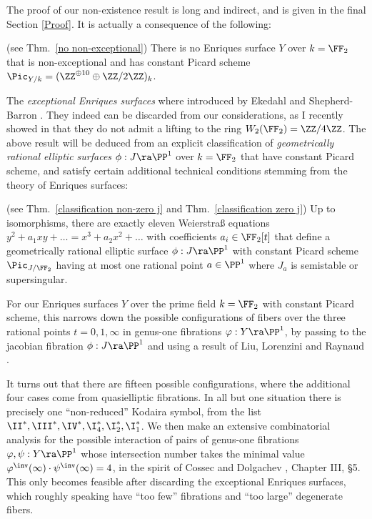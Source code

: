 The proof of our non-existence result is long and indirect, and is given in the final Section \ref{Proof}.
It is actually a  consequence of the following:

\begin{maintheorem}
\notready
{\rm (see Thm.\ \ref{no non-exceptional})}
There is no Enriques surface $Y$ over   $k=\FF_2$  that is non-exceptional and has
constant Picard scheme $\Pic_{Y/k}=(\ZZ^{\oplus 10}\oplus\ZZ/2\ZZ)_k$.
\end{maintheorem}

The  \emph{exceptional Enriques surfaces} where introduced by Ekedahl and Shepherd-Barron \cite{Ekedahl-Shepherd-Barron-2004}.
They indeed can be discarded from our considerations, as I recently showed in \cite{Schroeer-2021b} that they do not admit a lifting
to the ring $W_2(\FF_2)=\ZZ/4\ZZ$.
The above result will be deduced from an explicit classification of \emph{geometrically rational elliptic surfaces} $\phi:J\ra\PP^1$
over $k=\FF_2$ that have constant Picard scheme, and satisfy
certain additional technical conditions stemming from the theory of Enriques surfaces:

\begin{maintheorem}
\notready
{\rm (see Thm.\ \ref{classification non-zero j} and Thm.\ \ref{classification zero j})}
Up to isomorphisms, there are exactly eleven Weierstra\ss{}
equations $y^2+a_1xy + \ldots =x^3+a_2x^2+\ldots$ with coefficients $a_i\in \FF_2[t]$
that define a geometrically rational elliptic surface $\phi:J\ra\PP^1$
with constant Picard scheme $\Pic_{J/\FF_2}$  having at most one rational point $a\in \PP^1$ where $J_a$ is semistable or supersingular.
\end{maintheorem}

For our Enriques surfaces $Y$ over the prime field $k=\FF_2$ with constant Picard scheme,
this narrows down the possible configurations of fibers over the three rational points $t=0,1,\infty$
in genus-one fibrations $\varphi:Y\ra\PP^1$, by passing to the jacobian fibration $\phi:J\ra\PP^1$ and using
a result of Liu, Lorenzini and Raynaud \cite{Liu-Lorenzini-Raynaud-2005}.

It turns out that there are fifteen possible configurations,
where the  additional four cases come from quasielliptic fibrations. In all but one situation there is precisely one ``non-reduced''
Kodaira symbol, from the list $\II^*,\III^*,\IV^*,\I^*_4, \I_2^*, \I_1^*$.
We then make an extensive combinatorial analysis for the possible interaction of pairs of genus-one fibrations
$\varphi,\psi:Y\ra\PP^1$ whose intersection number takes the minimal value  $\varphi^\inv(\infty)\cdot\psi^\inv(\infty)=4$,
in the spirit of Cossec and Dolgachev \cite{Cossec-Dolgachev-1989}, Chapter III, \S 5.
This only becomes feasible after  discarding the   exceptional Enriques surfaces,
which roughly speaking have ``too few'' fibrations and ``too large'' degenerate fibers.

